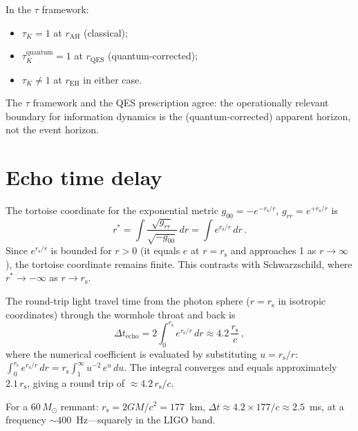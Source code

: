 \documentclass[prl,twocolumn,superscriptaddress,longbibliography,floatfix]{revtex4-2}
\newcommand{\tauasym}{\tau}
\newcommand{\rs}{r_{\mathrm{s}}}
\begin{document}
In the $\tauasym$ framework:
\begin{itemize}
\item $\tauasym_K = 1$ at $r_{\text{AH}}$ (classical);
\item $\tauasym_K^{\text{quantum}} = 1$ at
  $r_{\text{QES}}$ (quantum-corrected);
\item $\tauasym_K \neq 1$ at $r_{\text{EH}}$ in either case.
\end{itemize}

The $\tauasym$ framework and the QES prescription agree:
the operationally relevant boundary for information
dynamics is the (quantum-corrected) apparent horizon,
not the event horizon.

\section{Echo time delay}
\label{sec:echo}

The tortoise coordinate for the exponential metric
$g_{00} = -e^{-\rs/r}$,
$g_{rr} = e^{+\rs/r}$ is
\begin{equation}
  r^{*} = \int \frac{\sqrt{g_{rr}}}{\sqrt{-g_{00}}}\,dr
  = \int e^{\rs/r}\,dr\,.
  \label{eq:tortoise}
\end{equation}
Since $e^{\rs/r}$ is bounded for $r > 0$ (it equals $e$
at $r = \rs$ and approaches 1 as $r \to \infty$), the
tortoise coordinate remains finite.
This contrasts with Schwarzschild, where
$r^{*} \to -\infty$ as $r \to \rs$.

The round-trip light travel time from the photon sphere
($r = \rs$ in isotropic coordinates) through the wormhole
throat and back is
\begin{equation}
  \Delta t_{\text{echo}} = 2 \int_{0}^{\rs}
  e^{\rs/r}\,dr \approx 4.2\,\frac{\rs}{c}\,,
  \label{eq:echo_delay}
\end{equation}
where the numerical coefficient is evaluated by
substituting $u = \rs/r$:
$\int_0^{\rs} e^{\rs/r}\,dr
= \rs \int_1^{\infty} u^{-2}\,e^u\,du$.
The integral converges and equals approximately
$2.1\,\rs$, giving a round trip of $\approx 4.2\,\rs/c$.

For a $60\,M_\odot$ remnant:
$\rs = 2GM/c^2 = 177$~km,
$\Delta t \approx 4.2 \times 177/c \approx 2.5$~ms,
at a frequency $\sim 400$~Hz---squarely in the LIGO band.

\end{document}
